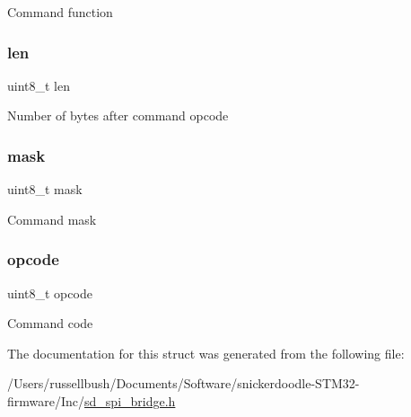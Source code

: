 Command function \mbox{\label{structsd__brdg__cmd_a5723e60ffd628510c699eddbce90be23}} 
\subsubsection{\texorpdfstring{len}{len}}
{\footnotesize\ttfamily uint8\+\_\+t len}

Number of bytes after command opcode \mbox{\label{structsd__brdg__cmd_a8a74907784be6c7786c2d060c8d7e10b}} 
\subsubsection{\texorpdfstring{mask}{mask}}
{\footnotesize\ttfamily uint8\+\_\+t mask}

Command mask \mbox{\label{structsd__brdg__cmd_a5c1b56e6bccc2a95dbddf1a08e56e87d}} 
\subsubsection{\texorpdfstring{opcode}{opcode}}
{\footnotesize\ttfamily uint8\+\_\+t opcode}

Command code 

The documentation for this struct was generated from the following file\+:\begin{DoxyCompactItemize}
\item 
/\+Users/russellbush/\+Documents/\+Software/snickerdoodle-\/\+S\+T\+M32-\/firmware/\+Inc/\mbox{\hyperlink{sd__spi__bridge_8h}{sd\+\_\+spi\+\_\+bridge.\+h}}\end{DoxyCompactItemize}
